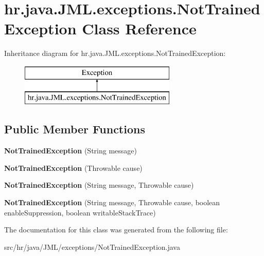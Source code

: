 \hypertarget{classhr_1_1java_1_1_j_m_l_1_1exceptions_1_1_not_trained_exception}{\section{hr.\+java.\+J\+M\+L.\+exceptions.\+Not\+Trained\+Exception Class Reference}
\label{classhr_1_1java_1_1_j_m_l_1_1exceptions_1_1_not_trained_exception}
}
Inheritance diagram for hr.\+java.\+J\+M\+L.\+exceptions.\+Not\+Trained\+Exception\+:\begin{figure}[H]
\begin{center}
\leavevmode
\includegraphics[height=2.000000cm]{classhr_1_1java_1_1_j_m_l_1_1exceptions_1_1_not_trained_exception}
\end{center}
\end{figure}
\subsection*{Public Member Functions}
\begin{DoxyCompactItemize}
\item 
\hypertarget{classhr_1_1java_1_1_j_m_l_1_1exceptions_1_1_not_trained_exception_a9172476b070bad6b53d178cb90c2779b}{{\bfseries Not\+Trained\+Exception} (String message)}\label{classhr_1_1java_1_1_j_m_l_1_1exceptions_1_1_not_trained_exception_a9172476b070bad6b53d178cb90c2779b}

\item 
\hypertarget{classhr_1_1java_1_1_j_m_l_1_1exceptions_1_1_not_trained_exception_a313bc1885ad94faaef5c1af2f42fe4b0}{{\bfseries Not\+Trained\+Exception} (Throwable cause)}\label{classhr_1_1java_1_1_j_m_l_1_1exceptions_1_1_not_trained_exception_a313bc1885ad94faaef5c1af2f42fe4b0}

\item 
\hypertarget{classhr_1_1java_1_1_j_m_l_1_1exceptions_1_1_not_trained_exception_afa8cb67117d7fd01887284362103a302}{{\bfseries Not\+Trained\+Exception} (String message, Throwable cause)}\label{classhr_1_1java_1_1_j_m_l_1_1exceptions_1_1_not_trained_exception_afa8cb67117d7fd01887284362103a302}

\item 
\hypertarget{classhr_1_1java_1_1_j_m_l_1_1exceptions_1_1_not_trained_exception_a5ecdd38a7209e31688c83407517ada73}{{\bfseries Not\+Trained\+Exception} (String message, Throwable cause, boolean enable\+Suppression, boolean writable\+Stack\+Trace)}\label{classhr_1_1java_1_1_j_m_l_1_1exceptions_1_1_not_trained_exception_a5ecdd38a7209e31688c83407517ada73}

\end{DoxyCompactItemize}


The documentation for this class was generated from the following file\+:\begin{DoxyCompactItemize}
\item 
src/hr/java/\+J\+M\+L/exceptions/Not\+Trained\+Exception.\+java\end{DoxyCompactItemize}
